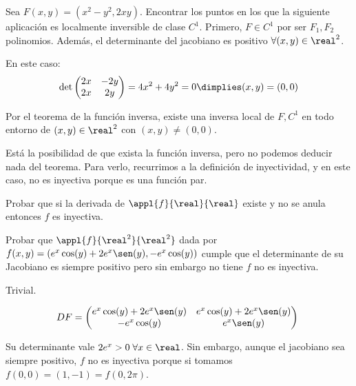 \begin{problem}[0]
\label{ej3_0}
Sea $F(x,y) = (x^2-y^2,2xy)$. Encontrar los puntos en los que la siguiente aplicación es localmente inversible de clase $C^1$.
\solution
Primero,  $F \in C^1$ por ser $F_1,F_2$ polinomios. Además, el determinante del jacobiano es positivo $\forall (x,y)\in \real^2$.

 En este caso: $$\det\begin{pmatrix}
                  2x&-2y\\
                  2x&2y
                 \end{pmatrix} = 4x^2 + 4y^2 = 0 \dimplies (x,y) = (0,0)$$

  Por el teorema de la función inversa, existe una inversa local de $F,C^1$ en todo entorno de $(x,y) \in \real^2$ con $(x,y)\neq (0,0)$.

 Está la posibilidad de que exista la función inversa, pero no podemos deducir nada del teorema. Para verlo, recurrimos a la definición de inyectividad, y en este caso, no es inyectiva porque es una función par.

 \end{problem}

\begin{problem}[3]

\ppart Probar que si la derivada de $\appl{f}{\real}{\real}$ existe y no se anula entonces $f$ es inyectiva.

\ppart Probar que $\appl{f}{\real^2}{\real^2}$ dada por $f(x,y) =( e^x\cos(y) + 2e^x\sen(y),-e^x\cos(y))$ cumple que el determinante de su Jacobiano es siempre positivo pero sin embargo no tiene $f$ no es inyectiva.

\solution

\ppart Trivial.

\ppart  \[ DF = \begin{pmatrix}
       e^x\cos(y)+2e^x\sen(y) & e^x\cos(y)+2e^x\sen(y) \\
       -e^x\cos(y) & e^x\sen(y)
      \end{pmatrix} \]

Su determinante vale $2e^x > 0\; \forall x \in \real$. Sin embargo, aunque el jacobiano sea siempre positivo, $f$ no es inyectiva porque si tomamos $f(0,0) = (1,-1) = f(0,2\pi)$.
\end{problem}


